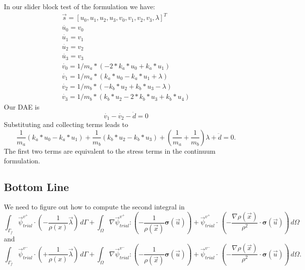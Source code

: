 \documentclass{article}
\newcommand{\trialvec}[1][]{{\vec{\psi}_\mathit{trial}^{#1}}}
\newcommand{\tensor}[1]{\bm{#1}}
\begin{document}
In our slider block test of the formulation we have:
\begin{gather}
   \vec{s} = [u_0, u_1, u_2, u_3, v_0, v_1, v_2, v_3, \lambda]^T \\
   \dot{u_0} = v_0 \\
   \dot{u_1} = v_1 \\
   \dot{u_2} = v_2 \\
   \dot{u_3} = v_3 \\
   \dot{v_0} = 1/m_a * (-2*k_a*u_0 + k_a*u_1) \\
   \dot{v_1} = 1/m_a * (k_a*u_0 - k_a*u_1 + \lambda) \\
   \dot{v_2} = 1/m_b * (-k_b*u_2 + k_b*u_3 - \lambda) \\
   \dot{v_3} = 1/m_b * (k_b*u_2 - 2*k_b*u_3 + k_b*u_4)
 \end{gather}
 Our DAE is
 \begin{equation}
   \dot{v_1} - \dot{v_2} - \ddot{d} = 0
 \end{equation}
 Substituting and collecting terms leads to
 \begin{equation}
   \frac{1}{m_a} \left(k_a*u_0 - k_a*u_1\right) + \frac{1}{m_b} \left(k_b*u_2 - k_b*u_3\right) + \left(\frac{1}{m_a} + \frac{1}{m_b}\right) \lambda + \ddot{d} = 0.
 \end{equation}
 The first two terms are equivalent to the stress terms in the continuum formulation.

\subsection{Bottom Line}

 We need to figure out how to compute the second integral in
\begin{equation}
\int_{\Gamma_f} \trialvec[v^+] \cdot \left(-\frac{1}{\rho(x)} \vec{\lambda} \right) \, d\Gamma
  + \int_\Omega \nabla\trialvec[v^+] : \left(-\frac{1}{\rho(\vec{x})} \tensor{\sigma}(\vec{u}) \right)
  + \trialvec[v^+] \cdot \, \left(-\frac{\nabla \rho(\vec{x})}{\rho^2} \cdot \tensor{\sigma}(\vec{u}) \right) \, d\Omega
\end{equation}
and
\begin{equation}
\int_{\Gamma_f} \trialvec[v^-] \cdot \left(+\frac{1}{\rho(x)} \vec{\lambda} \right) \, d\Gamma
  + \int_\Omega \nabla\trialvec[v^-] : \left(-\frac{1}{\rho(\vec{x})} \tensor{\sigma}(\vec{u}) \right)
  + \trialvec[v^-] \cdot \, \left(-\frac{\nabla \rho(\vec{x})}{\rho^2} \cdot \tensor{\sigma}(\vec{u}) \right) \, d\Omega.
\end{equation}
\end{document}

